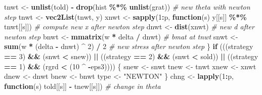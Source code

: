 \documentclass[
  12pt,
]{article}
\newenvironment{Shaded}{\begin{snugshade}}{\end{snugshade}}
\newcommand{\CommentTok}[1]{\textcolor[rgb]{0.56,0.35,0.01}{\textit{#1}}}
\newcommand{\ControlFlowTok}[1]{\textcolor[rgb]{0.13,0.29,0.53}{\textbf{#1}}}
\newcommand{\DecValTok}[1]{\textcolor[rgb]{0.00,0.00,0.81}{#1}}
\newcommand{\FunctionTok}[1]{\textcolor[rgb]{0.13,0.29,0.53}{\textbf{#1}}}
\newcommand{\NormalTok}[1]{#1}
\newcommand{\OtherTok}[1]{\textcolor[rgb]{0.56,0.35,0.01}{#1}}
\newcommand{\SpecialCharTok}[1]{\textcolor[rgb]{0.81,0.36,0.00}{\textbf{#1}}}
\newcommand{\StringTok}[1]{\textcolor[rgb]{0.31,0.60,0.02}{#1}}
\begin{document}
\begin{Shaded}
\begin{Highlighting}[]
\NormalTok{        tnwt }\OtherTok{\textless{}{-}}
          \FunctionTok{unlist}\NormalTok{(told) }\SpecialCharTok{{-}} \FunctionTok{drop}\NormalTok{(hist }\SpecialCharTok{\%*\%} \FunctionTok{unlist}\NormalTok{(grat)) }\CommentTok{\# new theta with newton step}
\NormalTok{        tnwt }\OtherTok{\textless{}{-}} \FunctionTok{vec2List}\NormalTok{(tnwt, y)}
\NormalTok{        xnwt }\OtherTok{\textless{}{-}}
          \FunctionTok{sapply}\NormalTok{(}\DecValTok{1}\SpecialCharTok{:}\NormalTok{p, }\ControlFlowTok{function}\NormalTok{(s)}
\NormalTok{            y[[s]] }\SpecialCharTok{\%*\%}\NormalTok{ tnwt[[s]]) }\CommentTok{\# compute new x after newton step}
\NormalTok{        dnwt }\OtherTok{\textless{}{-}} \FunctionTok{dist}\NormalTok{(xnwt) }\CommentTok{\# new d after newton step}
\NormalTok{        bnwt }\OtherTok{\textless{}{-}} \FunctionTok{mmatrix}\NormalTok{(w }\SpecialCharTok{*}\NormalTok{ delta }\SpecialCharTok{/}\NormalTok{ dnwt) }\CommentTok{\# bmat at tnwt}
\NormalTok{        snwt }\OtherTok{\textless{}{-}}
          \FunctionTok{sum}\NormalTok{(w }\SpecialCharTok{*}\NormalTok{ (delta }\SpecialCharTok{{-}}\NormalTok{ dnwt) }\SpecialCharTok{\^{}} \DecValTok{2}\NormalTok{) }\SpecialCharTok{/} \DecValTok{2} \CommentTok{\# new stress after newton step}
\NormalTok{      \}}
      \ControlFlowTok{if}\NormalTok{ (((strategy }\SpecialCharTok{==} \DecValTok{3}\NormalTok{) }\SpecialCharTok{\&\&}\NormalTok{ (snwt }\SpecialCharTok{\textless{}}\NormalTok{ snew)) }\SpecialCharTok{||}
\NormalTok{          ((strategy }\SpecialCharTok{==} \DecValTok{2}\NormalTok{) }\SpecialCharTok{\&\&}\NormalTok{ (snwt }\SpecialCharTok{\textless{}}\NormalTok{ sold)) }\SpecialCharTok{||}
\NormalTok{          ((strategy }\SpecialCharTok{==} \DecValTok{1}\NormalTok{) }\SpecialCharTok{\&\&}\NormalTok{ (rgrd }\SpecialCharTok{\textless{}}\NormalTok{ (}\DecValTok{10} \SpecialCharTok{\^{}} \SpecialCharTok{{-}}\NormalTok{eps3)))) \{}
\NormalTok{        snew }\OtherTok{\textless{}{-}}\NormalTok{ snwt}
\NormalTok{        tnew }\OtherTok{\textless{}{-}}\NormalTok{ tnwt}
\NormalTok{        xnew }\OtherTok{\textless{}{-}}\NormalTok{ xnwt}
\NormalTok{        dnew }\OtherTok{\textless{}{-}}\NormalTok{ dnwt}
\NormalTok{        bnew }\OtherTok{\textless{}{-}}\NormalTok{ bnwt}
\NormalTok{        type }\OtherTok{\textless{}{-}} \StringTok{"NEWTON"}
\NormalTok{      \}}
\NormalTok{      chng }\OtherTok{\textless{}{-}}
        \FunctionTok{lapply}\NormalTok{(}\DecValTok{1}\SpecialCharTok{:}\NormalTok{p, }\ControlFlowTok{function}\NormalTok{(s)}
\NormalTok{          told[[s]] }\SpecialCharTok{{-}}\NormalTok{ tnew[[s]])  }\CommentTok{\# change in theta}

\end{Highlighting}
\end{Shaded}
\end{document}
